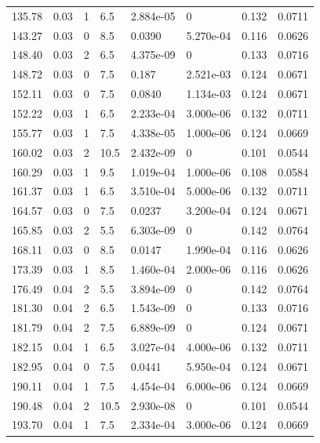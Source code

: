 \documentclass[preview]{standalone}
\begin{document}
{{{\begin{tabular}{L{1.2cm}C{1.2cm} C{0.3cm}C{0.5cm} C{1.4cm}C{1.4cm} C{1.4cm}C{1.4cm}}
  135.78  &  0.03  & 1     & 6.5 &  2.884e-05  & 0  & 0.132 &  0.0711   \\ 
  143.27  &  0.03  & 0     & 8.5 &  0.0390  & 5.270e-04  & 0.116 &  0.0626   \\ 
  148.40  &  0.03  & 2     & 6.5 &  4.375e-09  & 0  & 0.133 &  0.0716   \\ 
  148.72  &  0.03  & 0     & 7.5 &  0.187  & 2.521e-03  & 0.124 &  0.0671   \\ 
  152.11  &  0.03  & 0     & 7.5 &  0.0840  & 1.134e-03  & 0.124 &  0.0671   \\ 
  152.22  &  0.03  & 1     & 6.5 &  2.233e-04  & 3.000e-06  & 0.132 &  0.0711   \\ 
  155.77  &  0.03  & 1     & 7.5 &  4.338e-05  & 1.000e-06  & 0.124 &  0.0669   \\ 
  160.02  &  0.03  & 2     & 10.5 &  2.432e-09  & 0  & 0.101 &  0.0544   \\ 
  160.29  &  0.03  & 1     & 9.5 &  1.019e-04  & 1.000e-06  & 0.108 &  0.0584   \\ 
  161.37  &  0.03  & 1     & 6.5 &  3.510e-04  & 5.000e-06  & 0.132 &  0.0711   \\ 
  164.57  &  0.03  & 0     & 7.5 &  0.0237  & 3.200e-04  & 0.124 &  0.0671   \\ 
  165.85  &  0.03  & 2     & 5.5 &  6.303e-09  & 0  & 0.142 &  0.0764   \\ 
  168.11  &  0.03  & 0     & 8.5 &  0.0147  & 1.990e-04  & 0.116 &  0.0626   \\ 
  173.39  &  0.03  & 1     & 8.5 &  1.460e-04  & 2.000e-06  & 0.116 &  0.0626   \\ 
  176.49  &  0.04  & 2     & 5.5 &  3.894e-09  & 0  & 0.142 &  0.0764   \\ 
  181.30  &  0.04  & 2     & 6.5 &  1.543e-09  & 0  & 0.133 &  0.0716   \\ 
  181.79  &  0.04  & 2     & 7.5 &  6.889e-09  & 0  & 0.124 &  0.0671   \\ 
  182.15  &  0.04  & 1     & 6.5 &  3.027e-04  & 4.000e-06  & 0.132 &  0.0711   \\ 
  182.95  &  0.04  & 0     & 7.5 &  0.0441  & 5.950e-04  & 0.124 &  0.0671   \\ 
  190.11  &  0.04  & 1     & 7.5 &  4.454e-04  & 6.000e-06  & 0.124 &  0.0669   \\ 
  190.48  &  0.04  & 2     & 10.5 &  2.930e-08  & 0  & 0.101 &  0.0544   \\ 
  193.70  &  0.04  & 1     & 7.5 &  2.334e-04  & 3.000e-06  & 0.124 &  0.0669   \\ 

\end{tabular}}}}
\end{document}
